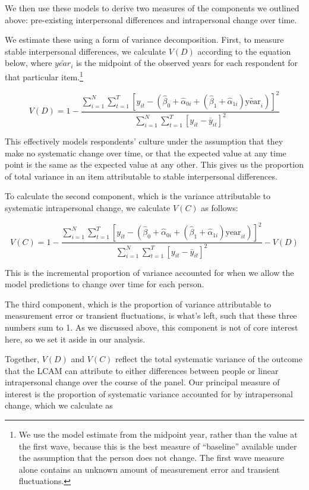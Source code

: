 \documentclass[
  12pt,
]{article}
\begin{document}
We then use these models to derive two measures of the components we
outlined above: pre-existing interpersonal differences and intrapersonal
change over time.

We estimate these using a form of variance decomposition. First, to
measure stable interpersonal differences, we calculate \(V(D)\)
according to the equation below, where \(\widetilde{year_i}\) is the
midpoint of the observed years for each respondent for that particular
item.\footnote{We use the model estimate from the midpoint year, rather
  than the value at the first wave, because this is the best measure of
  ``baseline'' available under the assumption that the person does not
  change. The first wave measure alone contains an unknown amount of
  measurement error and transient fluctuations.}

\[
V(D) = 1 - \frac{\sum_{i=1}^N \sum_{t=1}^T [y_{it} - (\hat{\beta}_0 + \hat{\alpha}_{0i} + (\hat{\beta}_1 + \hat{\alpha}_{1i}) \widetilde{\text{year}}_{i})]^2}{\sum_{i=1}^N \sum_{t=1}^T [y_{it} - \bar{y}_{it}]^2}
\]

This effectively models respondents' culture under the assumption that
they make no systematic change over time, or that the expected value at
any time point is the same as the expected value at any other. This
gives us the proportion of total variance in an item attributable to
stable interpersonal differences.

To calculate the second component, which is the variance attributable to
systematic intrapersonal change, we calculate \(V(C)\) as follows:

\[
V(C) = 1 - \frac{\sum_{i=1}^N \sum_{t=1}^T [y_{it} - (\hat{\beta}_0 + \hat{\alpha}_{0i} + (\hat{\beta}_1 + \hat{\alpha}_{1i}) \text{year}_{it})]^2}{\sum_{i=1}^N \sum_{t=1}^T [y_{it} - \bar{y}_{it}]^2} - V(D)
\]

This is the incremental proportion of variance accounted for when we
allow the model predictions to change over time for each person.

The third component, which is the proportion of variance attributable to
measurement error or transient fluctuations, is what's left, such that
these three numbers sum to 1. As we discussed above, this component is
not of core interest here, so we set it aside in our analysis.

Together, \(V(D)\) and \(V(C)\) reflect the total systematic variance of
the outcome that the LCAM can attribute to either differences between
people or linear intrapersonal change over the course of the panel. Our
principal measure of interest is the proportion of systematic variance
accounted for by intrapersonal change, which we calculate as
\end{document}
